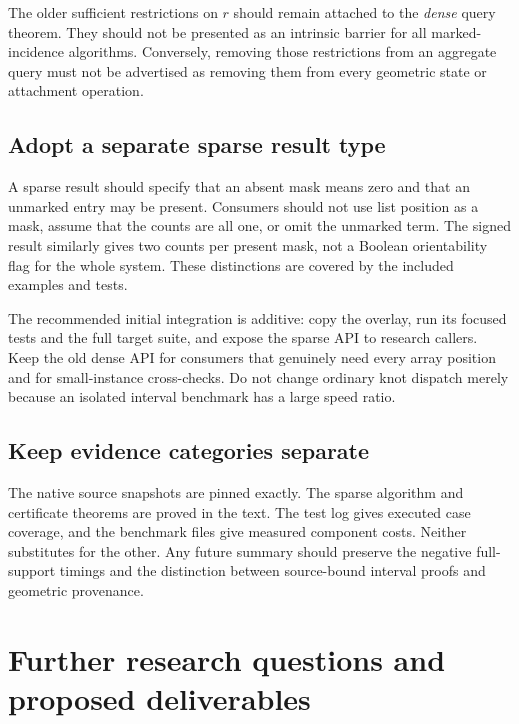 \documentclass[11pt,letterpaper]{article}
\theoremstyle{definition}
\begin{document}
The older sufficient restrictions on $r$ should remain attached to the
\emph{dense} query theorem. They should not be presented as an intrinsic
barrier for all marked-incidence algorithms. Conversely, removing those
restrictions from an aggregate query must not be advertised as removing
them from every geometric state or attachment operation.

\subsection{Adopt a separate sparse result type}
A sparse result should specify that an absent mask means zero and that an
unmarked entry may be present. Consumers should not use list position as a
mask, assume that the counts are all one, or omit the unmarked term.
The signed result similarly gives two counts per present mask, not a
Boolean orientability flag for the whole system. These distinctions are
covered by the included examples and tests.

The recommended initial integration is additive: copy the overlay, run
its focused tests and the full target suite, and expose the sparse API to
research callers. Keep the old dense API for consumers that genuinely
need every array position and for small-instance cross-checks. Do not
change ordinary knot dispatch merely because an isolated interval
benchmark has a large speed ratio.

\subsection{Keep evidence categories separate}
The native source snapshots are pinned exactly. The sparse algorithm and
certificate theorems are proved in the text. The test log gives executed
case coverage, and the benchmark files give measured component costs.
Neither substitutes for the other. Any future summary should preserve the
negative full-support timings and the distinction between source-bound
interval proofs and geometric provenance.

\section{Further research questions and proposed deliverables}\label{sec:future}
\end{document}

